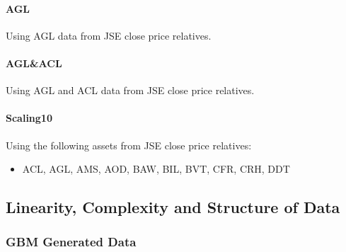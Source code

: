 \documentclass[a4paper,11pt,oneside]{article}
\theoremstyle{plain}
\theoremstyle{definition}
\begin{document}
\paragraph{AGL}\label{dataset_agl}

Using AGL data from JSE close price relatives.

\paragraph{AGL\&ACL}\label{dataset_aglacl}

Using AGL and ACL data from JSE close price relatives.

\paragraph{Scaling10}\label{dataset_scaling10}

Using the following assets from JSE close price relatives:

\begin{itemize}
	\item ACL, AGL, AMS, AOD, BAW, BIL, BVT, CFR, CRH, DDT
\end{itemize}











\newpage
\subsection{Linearity, Complexity and Structure of Data}

\subsubsection{GBM Generated Data}\label{results_gbm_data}
\end{document}
